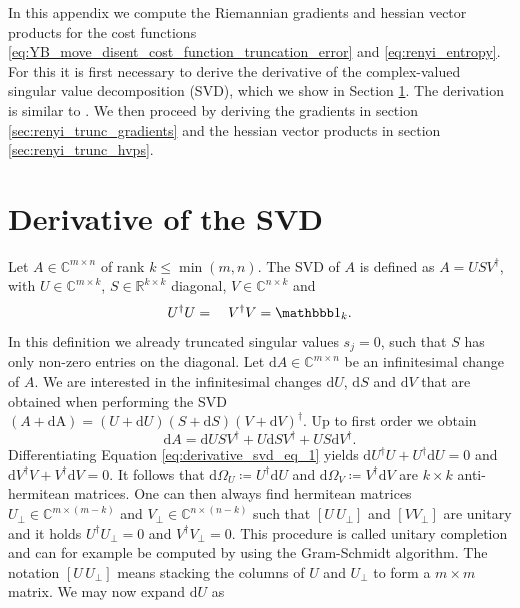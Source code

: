 In this appendix we compute the Riemannian gradients and hessian vector products for the cost functions \eqref{eq:YB_move_disent_cost_function_truncation_error} and \eqref{eq:renyi_entropy}. For this it is first necessary to derive the derivative of the complex-valued singular value decomposition (SVD), which we show in Section \ref{sec:derivative_of_SVD}. The derivation is similar to \cite{cite:differentiating_the_svd}. We then proceed by deriving the gradients in section \ref{sec:renyi_trunc_gradients} and the hessian vector products in section \ref{sec:renyi_trunc_hvps}.
\section{Derivative of the SVD}
\label{sec:derivative_of_SVD}
Let $A\in\mathbb{C}^{m\times n}$ of rank $k \le \min(m,n)$. The SVD of $A$ is defined as $A = USV^\dagger$, with $U\in\mathbb{C}^{m\times k}$, $S\in\mathbb{R}^{k\times k}$ diagonal, $V\in\mathbb{C}^{n\times k}$ and
\begin{equation}
	\label{eq:derivative_svd_eq_1}
	 U^\dagger U = \quad V^\dagger V = \id_k.
\end{equation}
In this definition we already truncated singular values $s_j = 0$, such that $S$ has only non-zero entries on the diagonal. Let $\text{d}A\in\mathbb{C}^{m\times n}$ be an infinitesimal change of $A$. We are interested in the infinitesimal changes $\text{d}U$, $\text{d}S$ and $\text{d}V$ that are obtained when performing the SVD $(A+\text{dA}) = (U + \text{d}U)(S + \text{d}S)(V + \text{d}V)^\dagger$. Up to first order we obtain
\begin{equation}
	\label{eq:derivative_svd_eq_2}
	\text{d}A = \text{d}USV^\dagger + U\text{d}SV^\dagger + US\text{d}V^\dagger.
\end{equation}
Differentiating Equation \eqref{eq:derivative_svd_eq_1} yields $\text{d}U^\dagger U + U^\dagger\text{d}U = 0$ and $\text{d}V^\dagger V + V^\dagger\text{d}V = 0$. It follows that $\text{d}\Omega_U \coloneqq U^\dagger\text{d}U$ and $\text{d}\Omega_V \coloneqq V^\dagger\text{d}V$ are $k\times k$ anti-hermitean matrices. One can then always find hermitean matrices $U_\perp\in\mathbb{C}^{m\times(m-k)}$ and $V_\perp\in\mathbb{C}^{n\times(n-k)}$ such that $\left[U\,U_\perp\right]$ and $\left[V V_\perp\right]$ are unitary and it holds $U^\dagger U_\perp = 0$ and $V^\dagger V_\perp = 0$. This procedure is called unitary completion and can for example be computed by using the Gram-Schmidt algorithm. The notation $\left[U\,U_\perp\right]$ means stacking the columns of $U$ and $U_\perp$ to form a $m\times m$ matrix. We may now expand $\text{d}U$ as

